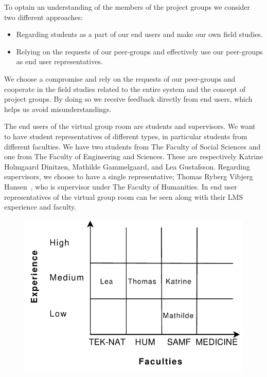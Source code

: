 To optain an understanding of the members of the project groups we consider two different approaches:  
\begin{itemize}
\item Regarding students as a part of our end users and make our own field studies.
\item Relying on the requests of our peer-groups and effectively use our peer-groups as end user representatives.
\end{itemize}
We choose a compromise and rely on the requests of our peer-groups and cooperate in the field studies related to the entire system and the concept of project groups.
By doing so we receive feedback directly from end users, which helps us avoid misunderstandings.


The end users of the virtual group room are students and supervisors.
We want to have student representatives of different types, in particular students from different faculties.
We have two students from The Faculty of Social Sciences and one from The Faculty of Engineering and Sciences.
These are respectively Katrine Holmgaard Dinitzen, Mathilde Gammelgaard, and Lea Gustafsson.
Regarding supervisors, we choose to have a single representative; Thomas Ryberg Vibjerg Hansen~\cite{thomas}, who is supervisor under The Faculty of Humanities.
In  end user representatives of the virtual group room can be seen along with their LMS experience and faculty.

\begin{figure}%
\center
\includegraphics[scale=0.50]{images/MembersofpROJECTgROUJP}%
%
\label{fig:memPG}%
\end{figure}

